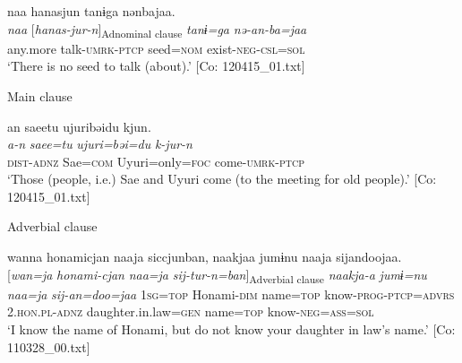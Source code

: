 \ex
{\TM}
\glll  naa  hanasjun  tanɨga  nənbajaa.\\
\textit{naa}  [\textit{hanas-jur-n}]\textsubscript{Adnominal clause}  \textit{tanɨ=ga}  \textit{nə-an-ba=jaa}\\
any.more  talk-\textsc{umrk}-\textsc{ptcp}  seed=\textsc{nom}  exist-\textsc{neg}-\textsc{csl}=\textsc{sol}\\
\glt ‘There is no seed to talk (about).’ [Co: 120415\_01.txt]
\z

  Main clause

\ex
{\TM}
\glll  an  saeetu  ujuribəidu  kjun.\\
\textit{a-n}  \textit{saee=tu}  \textit{ujuri=bəi=du}  \textit{k-jur-n}\\
\textsc{dist}-\textsc{adnz}  Sae=\textsc{com}  Uyuri=only=\textsc{foc}  come-\textsc{umrk}-\textsc{ptcp}\\
\glt ‘Those (people, i.e.) Sae and Uyuri come (to the meeting for old people).’ [Co: 120415\_01.txt]
\z

  Adverbial clause

\ex
{\TM}
\glll  wanna  honami{\textbar}cjan{\textbar}  naaja  siccjunban,      naakjaa  jumɨnu  naaja  sijandoojaa.\\
{}[\textit{wan=ja}  \textit{honami-cjan}  \textit{naa=ja}  \textit{sij-tur-n=ban}]\textsubscript{Adverbial clause}      \textit{naakja-a}  \textit{jumɨ=nu}  \textit{naa=ja}  \textit{sij-an=doo=jaa}
      1\textsc{sg}=\textsc{top}  Honami-\textsc{dim}  name=\textsc{top}  know-\textsc{prog}-\textsc{ptcp}=\textsc{advrs}  2.\textsc{hon}.\textsc{pl}-\textsc{adnz}  daughter.in.law=\textsc{gen}  name=\textsc{top}  know-\textsc{neg}=\textsc{ass}=\textsc{sol}\\
\glt ‘I know the name of Honami, but do not know your daughter in law’s name.’ [Co: 110328\_00.txt]
\z
\z

